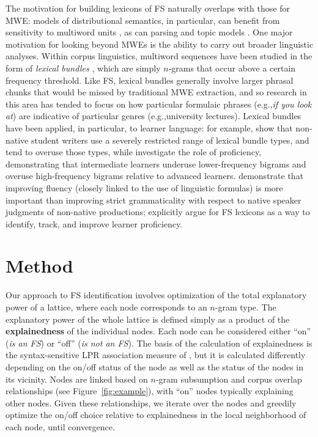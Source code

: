 \documentclass[11pt,letterpaper]{article}
\makeatletter
\def \eg {e.g.,\@ }
\newcommand{\termdef}[1]{\textbf{#1}\xspace}
\newcommand{\figref}[2][]{Figure#1~\ref{#2}\xspace}
\makeatother
\begin{document}
The motivation for building lexicons of FS naturally overlaps with those for MWE: models of distributional semantics, in particular, can benefit from sensitivity to multiword units \cite{Cohen:Widdows:2009}, as can parsing \cite{Constant16} and topic models \cite{Lau+:2012b}. One major motivation for looking beyond MWEs is the ability to carry out broader linguistic analyses. Within corpus linguistics, multiword sequences have been studied in the form of \textit{lexical bundles} \cite{Biber04}, which are simply $n$-grams that occur above a certain frequency threshold. Like FS, lexical bundles generally involve larger phrasal chunks that would be missed by traditional MWE extraction, and so research in this area has tended to focus on how particular formulaic phrases (\eg \textit{if you look at}) are indicative of particular genres (\eg university lectures). Lexical bundles have been applied, in particular, to learner language: for example,   show that non-native student writers use a severely restricted range of lexical bundle types, and tend to overuse those types, while  investigate the role of proficiency, demonstrating that intermediate learners underuse lower-frequency bigrams and overuse high-frequency bigrams relative to advanced learners.  demonstrate that improving fluency (closely linked to the use of linguistic formulas) is more important than improving strict grammaticality with respect to native speaker judgments of non-native productions;  explicitly argue for FS lexicons as a way to identify, track, and improve learner proficiency.


\section{Method}

Our approach to FS identification involves optimization of the total explanatory power of a lattice, where each node corresponds to an $n$-gram type. The explanatory power of the whole lattice is defined simply as a product of the \termdef{explainedness} of the individual nodes. Each node can be considered either ``on'' (\textit{is an FS}) or ``off'' (\textit{is not an FS}). The basis of the calculation of explainedness is the syntax-sensitive LPR association measure of , but it is calculated differently depending on the on/off status of the node as well as the status of the nodes in its vicinity. Nodes are linked based on $n$-gram subsumption and corpus overlap relationships (see \figref{fig:example}), with ``on'' nodes typically explaining other nodes.  Given these relationships, we iterate over the nodes and greedily optimize the on/off choice relative to explainedness in the local neighborhood of each node, until convergence.
\end{document}
